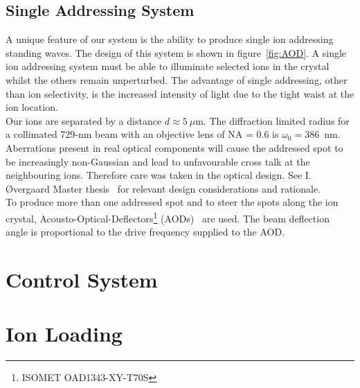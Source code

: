 \subsection{Single Addressing System}
\label{sec:Single Addressing System}
    A unique feature of our system is the ability to produce single ion addressing standing waves.
    The design of this system is shown in
    figure~\ref{fig:AOD}.  A single ion addressing system must be able to
    illuminate selected ions in the crystal whilst the others remain
    unperturbed. The advantage of single addressing, other than ion selectivity,
    is the increased intensity of light due to the tight waist at the ion
    location. \\
    Our ions are separated by a distance $d\approx 5~\mu$m.  The diffraction limited radius for a
    collimated 729-nm beam with an objective lens of NA = 0.6 is $\omega_0 = 386$~nm.  Aberrations present in real optical
    components will cause the addressed spot to be increasingly non-Gaussian and
    lead to unfavourable cross talk at the neighbouring ions. Therefore care was
    taken in the optical design. See I. {\O}vergaard Master thesis~\cite{oevergaard2024limiting} for relevant design considerations and rationale.\\
    To produce more than one addressed spot and to steer the spots along the ion
    crystal, Acousto-Optical-Deflectors\footnote{ISOMET OAD1343-XY-T70S}
    (AODs)~\cite{nagourney2014quantum, li2023low-crosstalk} are used. The beam deflection angle is proportional to the
    drive frequency supplied to the AOD. \\

\section{Control System}

\section{Ion Loading}
